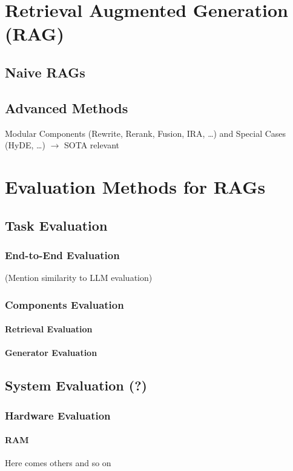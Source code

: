 \section{Retrieval Augmented Generation (RAG)}

\subsection{Naive RAGs}

\subsection{Advanced Methods}

Modular Components (Rewrite, Rerank, Fusion, IRA, \dots) and Special Cases (HyDE, \dots) $\longrightarrow$ SOTA relevant


\section{Evaluation Methods for RAGs}

\subsection{Task Evaluation}

\subsubsection{End-to-End Evaluation}
(Mention similarity to LLM evaluation)

\subsubsection{Components Evaluation}

\paragraph{Retrieval Evaluation}

\paragraph{Generator Evaluation}

\subsection{System Evaluation (?)}

\subsubsection{Hardware Evaluation}

\paragraph{RAM} 

Here comes others and so on
